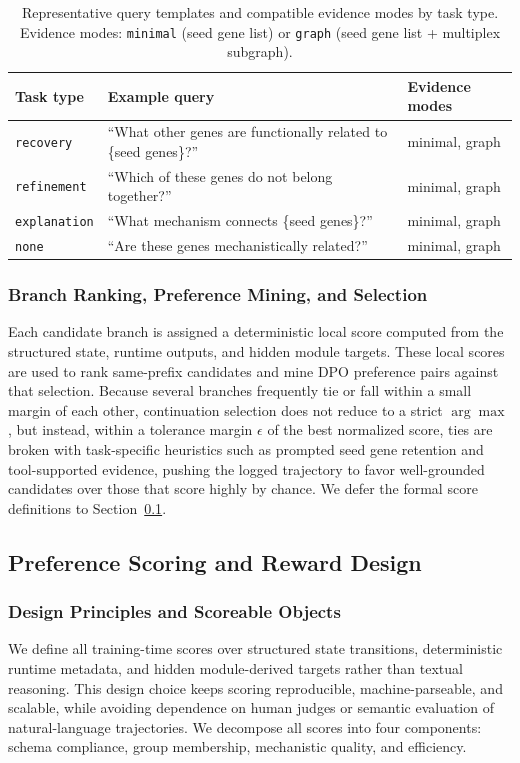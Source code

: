 \documentclass[thesis,letterpaper,12pt]{utthesis}
\begin{document}
\begin{table}[ht]
\centering
\caption{Representative query templates and compatible evidence modes by task type. Evidence modes: \texttt{minimal} (seed gene list) or \texttt{graph} (seed gene list + multiplex subgraph).}
\label{tbl:query-templates}
\begin{tabularx}{\textwidth}{l Y l}
\toprule
\textbf{Task type} & \textbf{Example query} & \textbf{Evidence modes} \\
\midrule
\texttt{recovery} & ``What other genes are functionally related to \{seed genes\}?'' & minimal, graph \\
\texttt{refinement} & ``Which of these genes do not belong together?'' & minimal, graph \\
\texttt{explanation} & ``What mechanism connects \{seed genes\}?'' & minimal, graph \\
\texttt{none} & ``Are these genes mechanistically related?'' & minimal, graph \\
\bottomrule
\end{tabularx}
\end{table}

\subsubsection{Branch Ranking, Preference Mining, and Selection}\label{sec:branch-ranking}
Each candidate branch is assigned a deterministic local score computed from the structured state, runtime outputs, and hidden module targets. These local scores are used to rank same-prefix candidates and mine DPO preference pairs against that selection. Because several branches frequently tie or fall within a small margin of each other, continuation selection does not reduce to a strict $\arg\max$, but instead, within a tolerance margin $\epsilon$ of the best normalized score, ties are broken with task-specific heuristics such as prompted seed gene retention and tool-supported evidence, pushing the logged trajectory to favor well-grounded candidates over those that score highly by chance. We defer the formal score definitions to Section~\ref{sec:rewards}.

\subsection{Preference Scoring and Reward Design}\label{sec:rewards}
\subsubsection{Design Principles and Scoreable Objects}
We define all training-time scores over structured state transitions, deterministic runtime metadata, and hidden module-derived targets rather than textual reasoning. This design choice keeps scoring reproducible, machine-parseable, and scalable, while avoiding dependence on human judges or semantic evaluation of natural-language trajectories. We decompose all scores into four components: schema compliance, group membership, mechanistic quality, and efficiency. 
\end{document}
